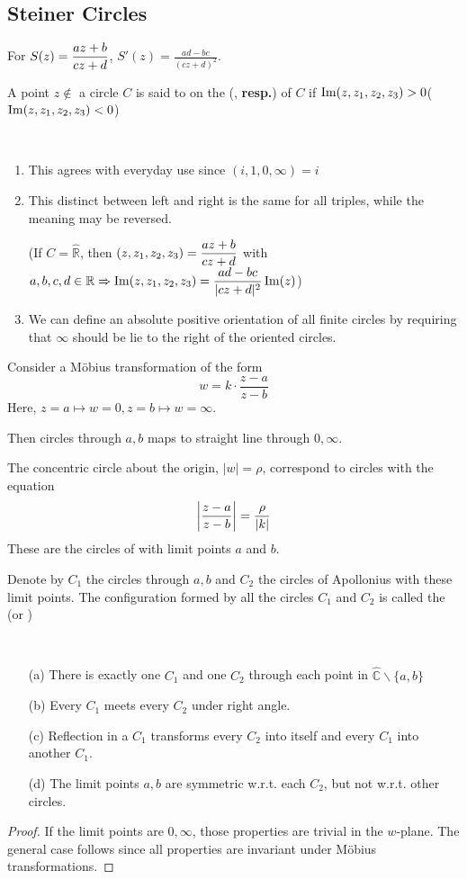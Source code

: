 \subsection{Steiner Circles}
For  $ S(z)=\displaystyle\frac{az+b}{cz+d} $,  $ S'(z)=\frac{ad-bc }{(cz+d)^2} $.

A point  $ z\not\in  $ a circle  $ C $ is said to on the (, \textbf{resp.}) of  $ C $ if  $ \operatorname{Im}(z,z_1,z_2,z_3)>0 $($ \operatorname{Im}(z,z_1,z_2,z_3)<0 $)

\begin{remark}
    \,
    \begin{enumerate}
        \item This agrees with everyday use since  $ (i,1,0,\infty)=i $ 
        \item This distinct between left and right is the same for all triples, while the meaning may be reversed.
        
        (If  $ C=\hat{\mathbb{R}} $, then  $ (z,z_1,z_2,z_3)=\displaystyle\frac{az+b}{cz+d} $ with  $ a,b,c,d\in\mathbb{R} \Rightarrow \operatorname{Im}(z,z_1,z_2,z_3)=\displaystyle\frac{ad-bc}{|cz+d|^2}\operatorname{Im}(z)$)
        \item We can define an absolute positive orientation of all finite circles by requiring that  $ \infty $ should be lie to the right of the oriented circles. 
    \end{enumerate}
    Consider a M{\"o}bius transformation of the form 
    \[w=k\cdot\frac{z-a}{z-b}\]
    Here,  $ z=a\mapsto w=0,z=b\mapsto w=\infty $.
    
    Then circles through  $ a,b $ maps to straight line through  $ 0,\infty $.
    
    The concentric circle about the origin, $ |w|=\rho $, correspond to circles with the equation 
    \[\displaystyle\left|\frac{z-a}{z-b}\right|=\frac{\rho}{|k|}\]
    These are the circles of  with limit points  $ a $ and  $ b $. 
\end{remark}
Denote by  $ C_1 $ the circles through  $ a,b $ and  $ C_2 $ the circles of Apollonius with these limit points. The configuration formed by all the circles  $ C_1 $ and  $ C_2 $ is called the (or )
\begin{theorem}
    \,
    \begin{enumerate}
        \item[(a)] There is exactly one  $ C_1 $ and one  $ C_2 $ through each point in  $ \hat{\mathbb{C}}\backslash\{a,b\} $
        \item[(b)] Every  $ C_1 $  meets every  $ C_2 $ under right angle.
        \item[(c)] Reflection in a  $ C_1 $ transforms every  $ C_2 $ into itself and every  $ C_1 $ into another  $ C_1 $.
        \item[(d)] The limit points  $ a,b $ are symmetric w.r.t. each  $ C_2 $, but not w.r.t. other circles.     
    \end{enumerate}
\end{theorem}   
\begin{proof}
    If the limit points are  $ 0,\infty $, those properties are trivial in the  $ w $-plane. The general case follows since all properties are invariant under M{\"o}bius transformations.
\end{proof}
